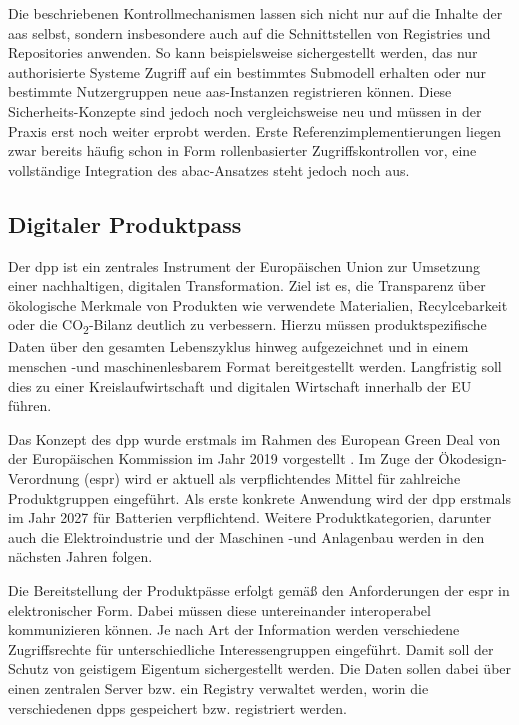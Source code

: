Die beschriebenen Kontrollmechanismen lassen sich nicht nur auf die Inhalte der \acs{aas} selbst, sondern insbesondere auch auf die Schnittstellen von Registries und Repositories anwenden.
So kann beispielsweise sichergestellt werden, das nur authorisierte Systeme Zugriff auf ein bestimmtes Submodell erhalten oder nur bestimmte Nutzergruppen neue \acs{aas}-Instanzen registrieren können.
Diese Sicherheits-Konzepte sind jedoch noch vergleichsweise neu und müssen in der Praxis erst noch weiter erprobt werden.
Erste Referenzimplementierungen liegen zwar bereits häufig schon in Form rollenbasierter Zugriffskontrollen vor, eine vollständige Integration des \acs{abac}-Ansatzes steht jedoch noch aus.


\subsection{Digitaler Produktpass}
Der \acs{dpp} ist ein zentrales Instrument der Europäischen Union zur Umsetzung einer nachhaltigen, digitalen Transformation. 
Ziel ist es, die Transparenz über ökologische Merkmale von Produkten wie verwendete Materialien, Recylcebarkeit oder die CO\textsubscript{2}-Bilanz deutlich zu verbessern.
Hierzu müssen produktspezifische Daten über den gesamten Lebenszyklus hinweg aufgezeichnet und in einem menschen -und maschinenlesbarem Format bereitgestellt werden. \cite{DPPEinführung}
Langfristig soll dies zu einer Kreislaufwirtschaft und digitalen Wirtschaft innerhalb der EU führen.

Das Konzept des \acs{dpp} wurde erstmals im Rahmen des European Green Deal von der Europäischen Kommission im Jahr 2019 vorgestellt \cite{GreenDeal}.
Im Zuge der Ökodesign-Verordnung (\ac{espr}) \cite{ESPR} wird er aktuell als verpflichtendes Mittel für zahlreiche Produktgruppen eingeführt.
Als erste konkrete Anwendung wird der \acs{dpp} erstmals im Jahr 2027 für Batterien verpflichtend.
Weitere Produktkategorien, darunter auch die Elektroindustrie und der Maschinen -und Anlagenbau werden in den nächsten Jahren folgen.

Die Bereitstellung der Produktpässe erfolgt gemäß den Anforderungen der \acs{espr} in elektronischer Form. 
Dabei müssen diese untereinander interoperabel kommunizieren können.
Je nach Art der Information werden verschiedene Zugriffsrechte für unterschiedliche Interessengruppen eingeführt. 
Damit soll der Schutz von geistigem Eigentum sichergestellt werden.
Die Daten sollen dabei über einen zentralen Server bzw. ein Registry verwaltet werden, worin die verschiedenen \acsp{dpp} gespeichert bzw. registriert werden.
\cite{CIRPASS}

